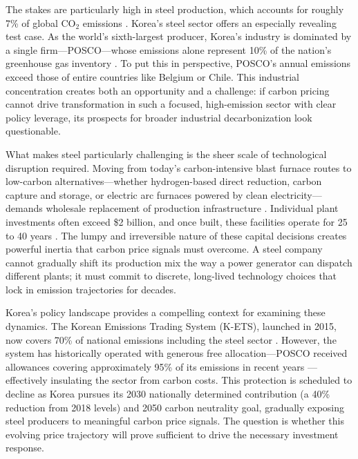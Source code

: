 \documentclass[preprint,1p,authoryear]{elsarticle}
\begin{document}
The stakes are particularly high in steel production, which accounts for roughly 7\% of global CO$_2$ emissions \citep{worldsteel2022}. Korea's steel sector offers an especially revealing test case. As the world's sixth-largest producer, Korea's industry is dominated by a single firm—POSCO—whose emissions alone represent 10\% of the nation's greenhouse gas inventory \citep{KOSIS2023}. To put this in perspective, POSCO's annual emissions exceed those of entire countries like Belgium or Chile. This industrial concentration creates both an opportunity and a challenge: if carbon pricing cannot drive transformation in such a focused, high-emission sector with clear policy leverage, its prospects for broader industrial decarbonization look questionable.

What makes steel particularly challenging is the sheer scale of technological disruption required. Moving from today's carbon-intensive blast furnace routes to low-carbon alternatives—whether hydrogen-based direct reduction, carbon capture and storage, or electric arc furnaces powered by clean electricity—demands wholesale replacement of production infrastructure \citep{IEA2020steel}. Individual plant investments often exceed \$2 billion, and once built, these facilities operate for 25 to 40 years \citep{MaterialEconomics2019}. The lumpy and irreversible nature of these capital decisions creates powerful inertia that carbon price signals must overcome. A steel company cannot gradually shift its production mix the way a power generator can dispatch different plants; it must commit to discrete, long-lived technology choices that lock in emission trajectories for decades.

Korea's policy landscape provides a compelling context for examining these dynamics. The Korean Emissions Trading System (K-ETS), launched in 2015, now covers 70\% of national emissions including the steel sector \citep{kim2021kets}. However, the system has historically operated with generous free allocation—POSCO received allowances covering approximately 95\% of its emissions in recent years \citep{ICAP2024}—effectively insulating the sector from carbon costs. This protection is scheduled to decline as Korea pursues its 2030 nationally determined contribution (a 40\% reduction from 2018 levels) and 2050 carbon neutrality goal, gradually exposing steel producers to meaningful carbon price signals. The question is whether this evolving price trajectory will prove sufficient to drive the necessary investment response.
\end{document}
